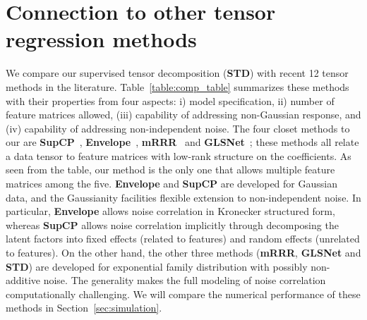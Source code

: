\documentclass[12pt]{article}
\theoremstyle{definition}
\theoremstyle{definition}
\begin{document}
\section{Connection to other tensor regression methods}\label{sec:connection}
{\color{blue}We compare our supervised tensor decomposition (\textbf{STD}) with recent 12 tensor methods in the literature. Table~\ref{table:comp_table} summarizes these methods with their properties from four aspects: i) model specification, ii) number of feature matrices allowed, (iii) capability of addressing non-Gaussian response, and (iv) capability of addressing non-independent noise. The four closet methods to our are {\bf SupCP}~\citep{lock2018supervised}, {\bf Envelope}~\citep{li2017parsimonious}, {\bf mRRR}~\citep{luo2018leveraging} and {\bf GLSNet}~\citep{zhang2018network}; these methods all relate a data tensor to feature matrices with low-rank structure on the coefficients. As seen from the table, our method is the only one that allows multiple feature matrices among the five. {\bf Envelope} and {\bf SupCP} are developed for Gaussian data, and the Gaussianity facilities flexible extension to non-independent noise. In particular, {\bf Envelope} allows noise correlation in Kronecker structured form, whereas {\bf SupCP} allows noise correlation implicitly through decomposing the latent factors into fixed effects (related to features) and random effects (unrelated to features). On the other hand, the other three methods ({\bf mRRR}, {\bf GLSNet} and {\bf STD}) are developed for exponential family distribution with possibly non-additive noise. The generality makes the full modeling of noise correlation computationally challenging. We will compare the numerical performance of these methods in Section~\ref{sec:simulation}.

}
\end{document}
